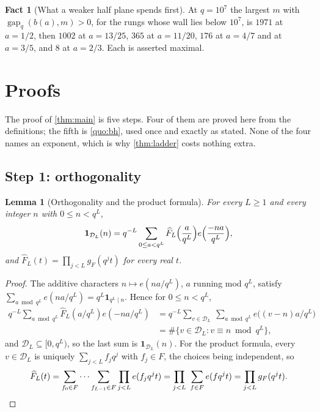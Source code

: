 \documentclass[11pt]{amsart}
\newtheorem{lemma}[theorem]{Lemma}
\theoremstyle{definition}
\newtheorem{fact}[theorem]{Fact}
\theoremstyle{remark}
\begin{document}
\begin{fact}[What a weaker half plane spends first]
\label{fact:budget}
At $q = 10^7$ the largest $m$ with $\operatorname{gap}_q(b(a), m) > 0$, for the rungs whose wall lies below $10^7$, is $1971$ at $a = 1/2$, then $1002$ at $a = 13/25$, $365$ at $a = 11/20$, $176$ at $a = 4/7$ and at $a = 3/5$, and $8$ at $a = 2/3$. Each is asserted maximal.
\end{fact}

\section{Proofs}
\label{sec:proofs}

The proof of \cref{thm:main} is five steps. Four of them are proved here from the definitions; the fifth is \cref{quo:bh}, used once and exactly as stated. None of the four names an exponent, which is why \cref{thm:ladder} costs nothing extra.

\subsection*{Step 1: orthogonality}

\begin{lemma}[Orthogonality and the product formula]
\label{lem:orth}
For every $L \ge 1$ and every integer $n$ with $0 \le n < q^L$,
\[
  \mathbf 1_{\mathcal D_L}(n) = q^{-L} \sum_{0 \le a < q^L} \widehat F_L\Bigl(\frac{a}{q^L}\Bigr) e\Bigl( \frac{-na}{q^L} \Bigr),
\]
and $\widehat F_L(t) = \prod_{j<L} g_F(q^j t)$ for every real $t$.
\end{lemma}

\begin{proof}
The additive characters $n \mapsto e(na/q^L)$, $a$ running mod $q^L$, satisfy $\sum_{a \bmod q^L} e(na/q^L) = q^L \mathbf 1_{q^L \mid n}$. Hence for $0 \le n < q^L$,
\begin{align*}
  q^{-L} \sum_{a \bmod q^L} \widehat F_L(a/q^L) e(-na/q^L)
  &= q^{-L} \sum_{v \in \mathcal D_L} \ \sum_{a \bmod q^L} e\bigl( (v - n) a / q^L \bigr) \\
  &= \#\bigl\{ v \in \mathcal D_L : v \equiv n \bmod q^L \bigr\} ,
\end{align*}
and $\mathcal D_L \subseteq [0, q^L)$, so the last sum is $\mathbf 1_{\mathcal D_L}(n)$. For the product formula, every $v \in \mathcal D_L$ is uniquely $\sum_{j<L} f_j q^j$ with $f_j \in F$, the choices being independent, so
\[
  \widehat F_L(t) = \sum_{f_0 \in F} \cdots \sum_{f_{L-1} \in F} \prod_{j<L} e(f_j q^j t) = \prod_{j<L} \ \sum_{f \in F} e(f q^j t) = \prod_{j<L} g_F(q^j t). \qedhere
\]
\end{proof}
\end{document}

